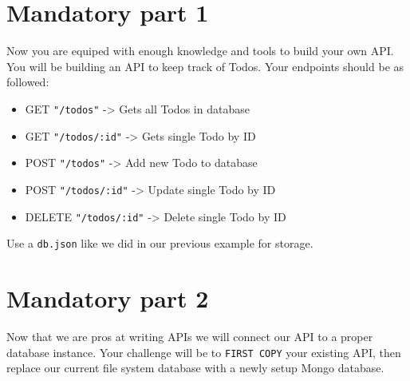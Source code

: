 \documentclass{42-en}
\begin{document}
\chapter{Mandatory part 1}

Now you are equiped with enough knowledge and tools to build your own API. You will be building an API to keep track of Todos. Your endpoints should be as followed:

\begin{itemize}\itemsep1pt
\item GET \texttt{"/todos"} -> Gets all Todos in database
\item GET \texttt{"/todos/:id"} -> Gets single Todo by ID
\item POST \texttt{"/todos"} -> Add new Todo to database
\item POST \texttt{"/todos/:id"} -> Update single Todo by ID
\item DELETE \texttt{"/todos/:id"} -> Delete single Todo by ID
\end{itemize}

Use a \texttt{db.json} like we did in our previous example for storage.

\newpage

\chapter{Mandatory part 2}

Now that we are pros at writing APIs we will connect our API to a proper database instance. Your challenge will be to \texttt{FIRST COPY} your existing API, then replace our current file system database with a newly setup Mongo database.\\
\end{document}
